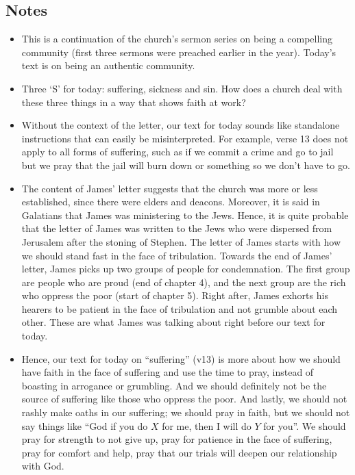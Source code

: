 \subsection*{Notes}
\begin{itemize}
  \item{This is a continuation of the church's sermon series on being a
  compelling community (first three sermons were preached earlier in the
  year).  Today's text is on being an authentic community.}
  \item{Three `S' for today: suffering, sickness and sin.  How does a church
  deal with these three things in a way that shows faith at work?}
  \item{Without the context of the letter, our text for today sounds like
  standalone instructions that can easily be misinterpreted.  For example,
  verse 13 does not apply to all forms of suffering, such as if we commit a
  crime and go to jail but we pray that the jail will burn down or something
  so we don't have to go.}
  \item{The content of James' letter suggests that the church was more or
  less established, since there were elders and deacons.  Moreover, it is
  said in Galatians that James was ministering to the Jews.  Hence, it is
  quite probable that the letter of James was written to the Jews who were
  dispersed from Jerusalem after the stoning of Stephen.  The letter of James
  starts with how we should stand fast in the face of tribulation.  Towards
  the end of James' letter, James picks up two groups of people for
  condemnation.  The first group are people who are proud (end of chapter 4),
  and the next group are the rich who oppress the poor (start of chapter 5).
  Right after, James exhorts his hearers to be patient in the face of
  tribulation and not grumble about each other.  These are what James was
  talking about right before our text for today.}
  \item{Hence, our text for today on ``suffering'' (v13) is more about how we
  should have faith in the face of suffering and use the time to pray,
  instead of boasting in arrogance or grumbling.  And we should definitely
  not be the source of suffering like those who oppress the poor.  And
  lastly, we should not rashly make oaths in our suffering; we should pray in
  faith, but we should not say things like ``God if you do $X$ for me, then I
  will do $Y$ for you''.  We should pray for strength to not give up, pray
  for patience in the face of suffering, pray for comfort and help, pray that
  our trials will deepen our relationship with God.}

\end{itemize}
